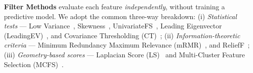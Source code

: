 \documentclass[preprint,12pt,authoryear]{elsarticle}
\begin{document}
\textbf{Filter Methods} evaluate each feature \emph{independently}, without training a predictive model. We adopt the common three-way breakdown:  
(i) \emph{Statistical tests} — Low Variance~\cite{pedregosa2011scikit,johnstone2009consistency}, Skewness~\cite{hochma2024efficient}, UnivariateFS~\cite{pedregosa2011scikit}, Leading Eigenvector (LeadingEV)~\cite{d2004direct}, and Covariance Thresholding (CT)~\cite{Bickel2008CovarianceMatrices};  
(ii) \emph{Information-theoretic criteria} — Minimum Redundancy Maximum Relevance (mRMR)~\cite{peng2005feature}, and ReliefF~\cite{robnik2003theoretical};  
(iii) \emph{Geometry-based scores} — Laplacian Score (LS)~\cite{he2005laplacian} and Multi-Cluster Feature Selection (MCFS)~\cite{cai2010unsupervised}.  
\end{document}
